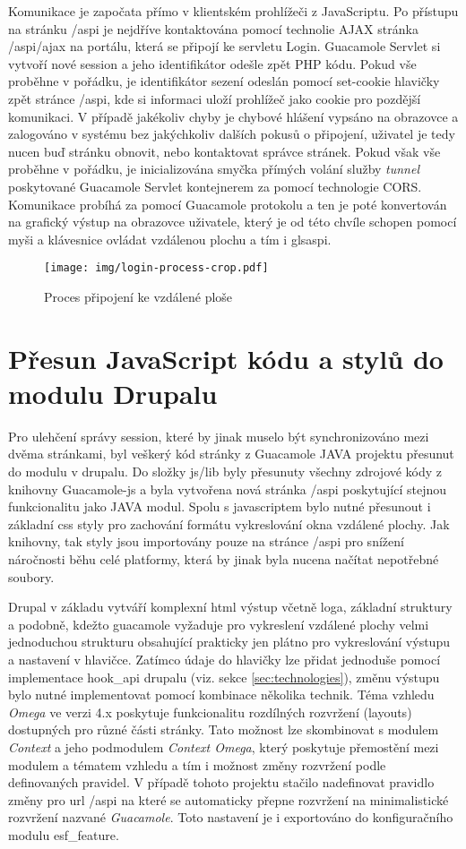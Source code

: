 Komunikace je započata přímo v klientském prohlížeči z JavaScriptu. Po přístupu na stránku /aspi je nejdříve kontaktována pomocí technolie AJAX stránka /aspi/ajax na portálu, která se připojí ke servletu Login. Guacamole Servlet si vytvoří nové \gls{session} a jeho identifikátor odešle zpět PHP kódu. Pokud vše proběhne v pořádku, je identifikátor sezení odeslán pomocí set-cookie hlavičky zpět stránce /aspi, kde si informaci uloží prohlížeč jako cookie pro pozdější komunikaci. V případě jakékoliv chyby je chybové hlášení vypsáno na obrazovce a zalogováno v systému bez jakýchkoliv dalších pokusů o připojení, uživatel je tedy nucen buď stránku obnovit, nebo kontaktovat správce stránek. Pokud však vše proběhne v pořádku, je inicializována smyčka přímých volání služby \emph{tunnel} poskytované Guacamole Servlet kontejnerem za pomocí technologie CORS. Komunikace probíhá za pomocí Guacamole protokolu a ten je poté konvertován na grafický výstup na obrazovce uživatele, který je od této chvíle schopen pomocí myši a klávesnice ovládat vzdálenou plochu a tím i gls{aspi}.

\begin{figure}[]
  \texttt{[image: img/login-process-crop.pdf]}
  \caption{Proces připojení ke vzdálené ploše}
  \label{fig:login_process}
\end{figure}  

\section{Přesun JavaScript kódu a stylů do modulu Drupalu}
Pro ulehčení správy \gls{session}, které by jinak muselo být synchronizováno mezi dvěma stránkami, byl veškerý kód stránky z Guacamole JAVA projektu přesunut do modulu v drupalu. Do složky js/lib byly přesunuty všechny zdrojové kódy z knihovny Guacamole-js a byla vytvořena nová stránka /aspi poskytující stejnou funkcionalitu jako JAVA modul. Spolu s javascriptem bylo nutné přesunout i základní css styly pro zachování formátu vykreslování okna vzdálené plochy. Jak knihovny, tak styly jsou importovány pouze na stránce /aspi pro snížení náročnosti běhu celé platformy, která by jinak byla nucena načítat nepotřebné soubory. 

Drupal v základu vytváří komplexní html výstup včetně loga, základní struktury a podobně, kdežto guacamole vyžaduje pro vykreslení vzdálené plochy velmi jednoduchou strukturu obsahující prakticky jen plátno pro vykreslování výstupu a nastavení v hlavičce. Zatímco údaje do hlavičky lze přidat jednoduše pomocí implementace hook\_api drupalu (viz. sekce \ref{sec:technologies}), změnu výstupu bylo nutné implementovat pomocí kombinace několika technik. Téma vzhledu \emph{Omega} ve verzi 4.x poskytuje funkcionalitu rozdílných rozvržení (layouts) dostupných pro různé části stránky. Tato možnost lze skombinovat s modulem \emph{Context} a jeho podmodulem \emph{Context Omega}, který poskytuje přemostění mezi modulem a tématem vzhledu a tím i možnost změny rozvržení podle definovaných pravidel. V případě tohoto projektu stačilo nadefinovat pravidlo změny pro url /aspi na které se automaticky přepne rozvržení na minimalistické rozvržení nazvané \emph{Guacamole}. Toto nastavení je i exportováno do konfiguračního modulu esf\_feature.

